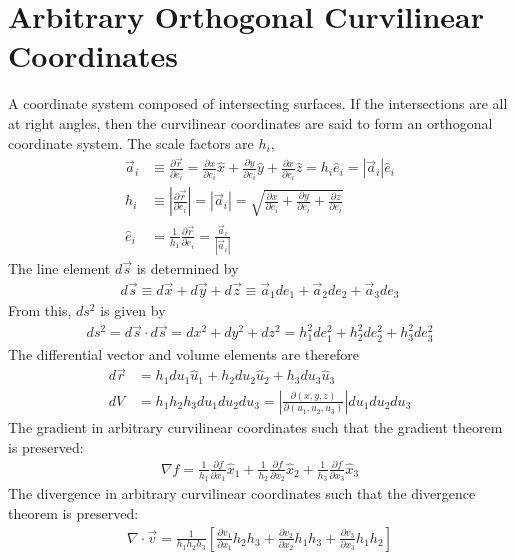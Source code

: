 \section{Arbitrary Orthogonal Curvilinear Coordinates}
A coordinate system composed of intersecting surfaces. If the intersections are all at right angles, then the curvilinear coordinates are said to form an orthogonal coordinate system. The scale factors are $h_i$,
\begin{align}
	\vec{a}_i &\equiv\frac{\partial \vec{r}}{\partial e_i} =  \frac{\partial x}{\partial e_i} \hat{x} + \frac{\partial y}{\partial e_i}\hat{y} + \frac{\partial x}{\partial e_i} \hat{z} = h_i \hat{e}_i = |\vec{a}_i| \hat{e}_i \\
	h_i &\equiv \left|\frac{\partial \vec{r}}{\partial e_i}\right|=|\vec{a}_i| = \sqrt{\frac{\partial x}{\partial e_i}+\frac{\partial y}{\partial e_i}+\frac{\partial z}{\partial e_i} } \\ \hat{e}_i &= \frac{1}{h_1}\frac{\partial \vec{r}}{\partial e_i}=\frac{\vec{a}_i}{|\vec{a}_i|}
\end{align}
The line element $d\vec{s}$ is determined by
\begin{align}
	d\vec{s}\equiv 
	d\vec{x}+d\vec{y}+d\vec{z} \equiv
	\vec{a}_1de_1+\vec{a}_2de_2+\vec{a}_3de_3
\end{align}
From this, $ds^2$ is given by
\begin{align}
	ds^2= d\vec{s}\cdot d\vec{s} = dx^2+dy^2+dz^2= h_1^2de_1^2+h_2^2de_2^2+h_3^2de_3^2
\end{align}
The differential vector and volume elements are therefore
\begin{align}
	d\vec{r} &= h_1 du_1 \hat{u}_1+h_2 du_2 \hat{u}_2+h_3 du_3 \hat{u}_3 \\
	dV &=h_1h_2h_3 du_1du_2du_3 = \left|\frac{\partial(x,y,z)}{\partial(u_1,u_2,u_3)}\right|du_1du_2du_3
\end{align}
The gradient in arbitrary curvilinear coordinates such that the gradient theorem is preserved:
\begin{align}
	\nabla f = \frac{1}{h_1}\frac{\partial f}{\partial x_1}\hat{x}_1+\frac{1}{h_2}\frac{\partial f}{\partial x_2}\hat{x}_2+\frac{1}{h_3}\frac{\partial f}{\partial x_3}\hat{x}_3
\end{align}
The divergence in arbitrary curvilinear coordinates such that the divergence theorem is preserved:
\begin{align}
	\nabla \cdot \vec{v} = \frac{1}{h_1h_2h_3}\left[\frac{\partial v_1}{\partial x_1}h_2h_3+\frac{\partial v_2}{\partial x_2}h_1h_3+\frac{\partial v_3}{\partial x_3}h_1h_2\right]
\end{align}
